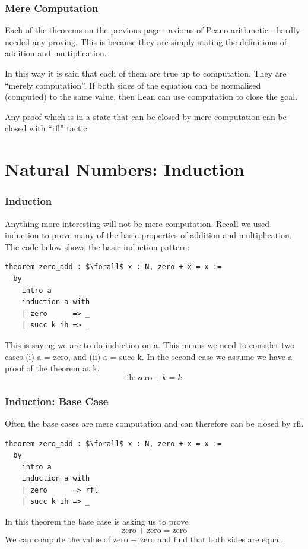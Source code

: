 \documentclass{beamer}
\theoremstyle{indentDefn} \newtheorem{defn}[]{Definition}
\begin{document}
\begin{frame}
	\frametitle{Mere Computation}
	
	Each of the theorems on the previous page - axioms of Peano arithmetic - hardly needed any proving. This is because they are simply stating the definitions of addition and multiplication. 
	
	In this way it is said that each of them are true up to computation. They are ``merely computation''. If both sides of the equation can be normalised (computed) to the same value, then Lean can use computation to close the goal.
	
	Any proof which is in a state that can be closed by mere computation can be closed with ``rfl'' tactic.

\end{frame}

\section{Natural Numbers: Induction}

\begin{frame}[fragile]
	\frametitle{Induction}
	
	Anything more interesting will not be mere computation. Recall we used induction to prove many of the basic properties of addition and multiplication. The code below shows the basic induction pattern:	
	\begin{lstlisting}
theorem zero_add : $\forall$ x : N, zero + x = x := 
  by
    intro a
    induction a with
    | zero      => _
    | succ k ih => _	
	\end{lstlisting}	
	This is saying we are to do induction on a. This means we need to consider two cases (i) a = zero, and (ii) a = succ k. In the second case we assume we have a proof of the theorem at k. 	
	$$\text{ih} : \text{zero} + k = k$$
\end{frame}

\begin{frame}[fragile]
	\frametitle{Induction: Base Case}
	
	Often the base cases are mere computation and can therefore can be closed by rfl.
	\begin{lstlisting}
theorem zero_add : $\forall$ x : N, zero + x = x := 
  by
    intro a
    induction a with
    | zero      => rfl
    | succ k ih => _	
	\end{lstlisting}	
	In this theorem the base case is asking us to prove 
	$$\text{zero} + \text{zero} = \text{zero}$$
	We can compute the value of zero + zero and find that both sides are equal.
\end{frame}
\end{document}
